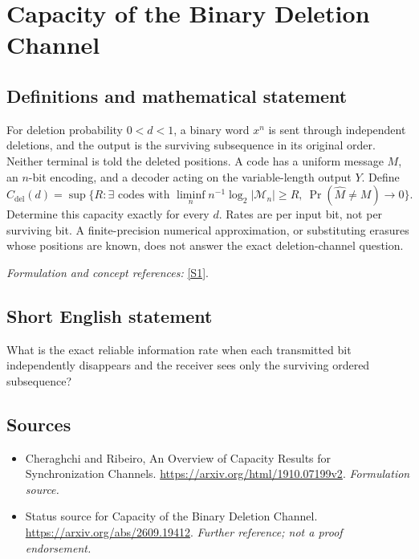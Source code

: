 \documentclass[11pt]{article}
\begin{document}
\section*{\texorpdfstring{Capacity of the Binary Deletion Channel}{Capacity of the Binary Deletion Channel}}\label{statement}
\subsection{Definitions and mathematical statement}
For deletion probability $0<d<1$, a binary word $x^n$ is sent through independent deletions, and the output is the surviving subsequence in its original order. Neither terminal is told the deleted positions. A code has a uniform message $M$, an $n$-bit encoding, and a decoder acting on the variable-length output $Y$. Define
\[
 C_{\mathrm{del}}(d)=\sup\{R:\exists\text{ codes with }\liminf_n n^{-1}\log_2|\mathcal M_n|\ge R,
 \ \Pr(\widehat M\ne M)\to0\}.
\]
Determine this capacity exactly for every $d$. Rates are per input bit, not per surviving bit. A finite-precision numerical approximation, or substituting erasures whose positions are known, does not answer the exact deletion-channel question.
\par\smallskip\textit{Formulation and concept references:} \href{https://arxiv.org/html/1910.07199v2}{[S1]}.

\subsection{Short English statement}
What is the exact reliable information rate when each transmitted bit independently disappears and the receiver sees only the surviving ordered subsequence?
\subsection{Sources}
\begin{itemize}
\item[S1]Cheraghchi and Ribeiro, An Overview of Capacity Results for Synchronization Channels.
\url{https://arxiv.org/html/1910.07199v2}.
\textit{Formulation source.}
\item[S2]Status source for Capacity of the Binary Deletion Channel.
\url{https://arxiv.org/abs/2609.19412}.
\textit{Further reference; not a proof endorsement.}
\end{itemize}
\end{document}
